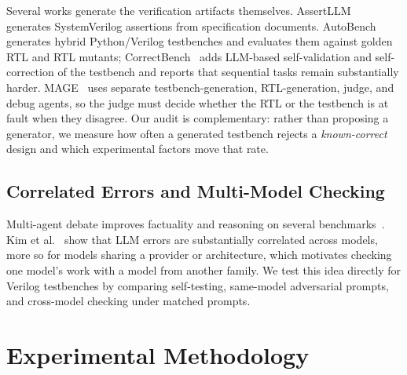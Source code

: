 \documentclass[conference]{IEEEtran}
\begin{document}
Several works generate the verification artifacts themselves. AssertLLM~\cite{yan2025assertllm} generates SystemVerilog assertions from specification documents. AutoBench~\cite{qiu2024autobench} generates hybrid Python/Verilog testbenches and evaluates them against golden RTL and RTL mutants; CorrectBench~\cite{qiu2024correctbench} adds LLM-based self-validation and self-correction of the testbench and reports that sequential tasks remain substantially harder. MAGE~\cite{zhao2024mage} uses separate testbench-generation, RTL-generation, judge, and debug agents, so the judge must decide whether the RTL or the testbench is at fault when they disagree. Our audit is complementary: rather than proposing a generator, we measure how often a generated testbench rejects a \textit{known-correct} design and which experimental factors move that rate.

\subsection{Correlated Errors and Multi-Model Checking}
Multi-agent debate improves factuality and reasoning on several benchmarks~\cite{du2023debate}. Kim et al.~\cite{kim2025correlated} show that LLM errors are substantially correlated across models, more so for models sharing a provider or architecture, which motivates checking one model's work with a model from another family. We test this idea directly for Verilog testbenches by comparing self-testing, same-model adversarial prompts, and cross-model checking under matched prompts.

\section{Experimental Methodology}
\end{document}
